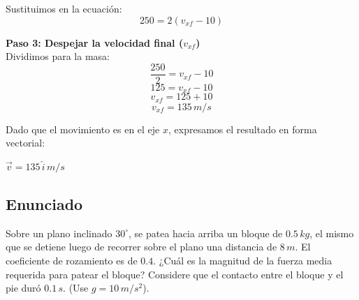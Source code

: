 \documentclass[12pt, a4paper]{article}
\begin{document}
Sustituimos en la ecuación:
$$ 250 = 2 (v_{xf} - 10) $$

\textbf{Paso 3: Despejar la velocidad final ($v_{xf}$)} \\
Dividimos para la masa:
$$ \frac{250}{2} = v_{xf} - 10 $$
$$ 125 = v_{xf} - 10 $$
$$ v_{xf} = 125 + 10 $$
$$ v_{xf} = 135 \, \si{m/s} $$

Dado que el movimiento es en el eje $x$, expresamos el resultado en forma vectorial:

\begin{tcolorbox}[colback=green!5!white, colframe=green!50!black, title=Respuesta Final]
\centering \Large $\vec{v} = 135 \, \hat{i} \, \si{m/s}$
\end{tcolorbox}

\subsection*{Enunciado}
Sobre un plano inclinado $30^\circ$, se patea hacia arriba un bloque de $0.5 \, \si{kg}$, el mismo que se detiene luego de recorrer sobre el plano una distancia de $8 \, \si{m}$. El coeficiente de rozamiento es de $0.4$. ¿Cuál es la magnitud de la fuerza media requerida para patear el bloque? Considere que el contacto entre el bloque y el pie duró $0.1 \, \si{s}$. (Use $g=10\,\si{m/s^2}$).
\end{document}
